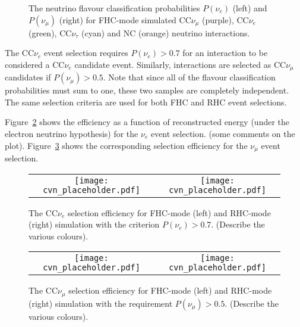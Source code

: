 \begin{figure}
    \centering
    \begin{tabular}{cc}
	\end{tabular}
	\caption{The neutrino flavour classification probabilities $P(\nu_e)$ (left) and $P(\nu_\mu)$ (right) for FHC-mode simulated CC$\nu_\mu$ (purple), CC$\nu_e$ (green), CC$\nu_\tau$ (cyan) and NC (orange) neutrino interactions.}
    \label{fig:cvnprob}
\end{figure}

The CC$\nu_e$ event selection requires $P(\nu_e) > 0.7$ for an interaction to be considered a CC$\nu_e$ candidate event. Similarly, interactions are selected as CC$\nu_\mu$ candidates if $P(\nu_\mu) > 0.5$. Note that since all of the flavour classification probabilities must sum to one, these two samples are completely independent. The same selection criteria are used for both FHC and RHC event selections.

Figure~\ref{fig:nueeff} shows the efficiency as a function of reconstructed energy (under the electron neutrino hypothesis) for the $\nu_e$ event selection. (some comments on the plot). Figure~\ref{fig:numueff} shows the corresponding selection efficiency for the $\nu_\mu$ event selection.

\begin{figure}
    \centering
    \begin{tabular}{cc}
		\texttt{[image: cvn\_placeholder.pdf]} &
		\texttt{[image: cvn\_placeholder.pdf]} 
	\end{tabular}
	\caption{The CC$\nu_e$ selection efficiency for FHC-mode (left) and RHC-mode (right) simulation with the criterion $P(\nu_e) > 0.7$. (Describe the various colours).}
    \label{fig:nueeff}
\end{figure}

\begin{figure}
    \centering
    \begin{tabular}{cc}
		\texttt{[image: cvn\_placeholder.pdf]} &
		\texttt{[image: cvn\_placeholder.pdf]} 
	\end{tabular}
	\caption{The CC$\nu_\mu$ selection efficiency for FHC-mode (left) and RHC-mode (right) simulation with the requirement $P(\nu_\mu) > 0.5$. (Describe the various colours).}
    \label{fig:numueff}
\end{figure}

